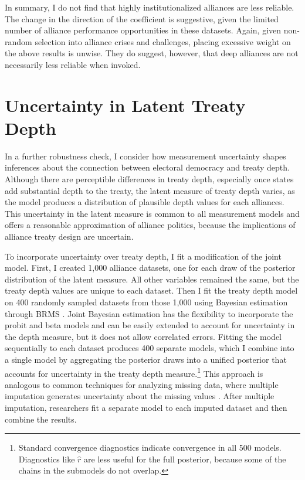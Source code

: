 \documentclass[12pt]{article}
\begin{document}
In summary, I do not find that highly institutionalized alliances are less reliable. 
The change in the direction of the coefficient is suggestive, given the limited number of alliance performance opportunities in these datasets. 
Again, given non-random selection into alliance crises and challenges, placing excessive weight on the above results is unwise. 
They do suggest, however, that deep alliances are not necessarily less reliable when invoked. 



\section{Uncertainty in Latent Treaty Depth} 


In a further robustness check, I consider how measurement uncertainty shapes inferences about the connection between electoral democracy and treaty depth. 
Although there are perceptible differences in treaty depth, especially once states add substantial depth to the treaty, the latent measure of treaty depth varies, as the model produces a distribution of plausible depth values for each alliances. 
This uncertainty in the latent measure is common to all measurement models and offers a reasonable approximation of alliance politics, because the implications of alliance treaty design are uncertain.  


To incorporate uncertainty over treaty depth, I fit a modification of the joint model. 
First, I created 1,000 alliance datasets, one for each draw of the posterior distribution of the latent measure.
All other variables remained the same, but the treaty depth values are unique to each dataset. 
Then I fit the treaty depth model on 400 randomly sampled datasets from those 1,000 using Bayesian estimation through BRMS \citep{Buerkner2017}. 
Joint Bayesian estimation has the flexibility to incorporate the probit and beta models and can be easily extended to account for uncertainty in the depth measure, but it does not allow correlated errors. 
Fitting the model sequentially to each dataset produces 400 separate models, which I combine into a single model by aggregating the posterior draws into a unified posterior that accounts for uncertainty in the treaty depth measure.\footnote{Standard convergence diagnostics indicate convergence in all 500 models. Diagnostics like $\hat{r}$ are less useful for the full posterior, because some of the chains in the submodels do not overlap.}
This approach is analogous to common techniques for analyzing missing data, where multiple imputation generates uncertainty about the missing values \citep{Hollenbachetal2018imp}.
After multiple imputation, researchers fit a separate model to each imputed dataset and then combine the results. 
\end{document}
